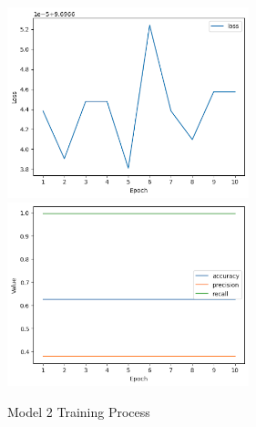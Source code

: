 \documentclass{article}
\begin{document}
\begin{figure}[htp]
    \centering
    \includegraphics[width=7cm]{model2_train1.png}
    \includegraphics[width=7cm]{model2_train2.png}
    \caption{Model 2 Training Process}
\end{figure}
\end{document}

